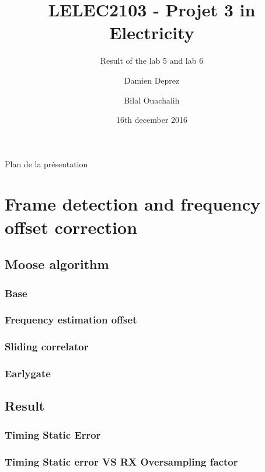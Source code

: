 \documentclass[11pt]{beamer}
\title{LELEC2103 - Projet 3 in Electricity}
\subtitle[\ldots]{Result of the lab 5 and lab 6}
\author[D. Deprez\and B. Ouachalih]{Damien Deprez\and Bilal Ouachalih}
\institute{EPL}
\date{16th december 2016}
\begin{document}
{
	\begin{frame}[noframenumbering]
		\titlepage
	\end{frame}
} 

{
	\begin{frame}[noframenumbering]{Plan de la présentation}
		\tableofcontents
	\end{frame}
}

\section{Frame detection and frequency offset correction}

\subsection{Moose algorithm}

\begin{frame}
\frametitle{Base}


\end{frame}


\subsubsection{Frequency estimation offset}
\begin{frame}
\frametitle{Sliding correlator}


\end{frame}

\subsubsection{}

\begin{frame}
\frametitle{Earlygate}


\end{frame}

\subsection{Result}
\subsubsection{Timing Static Error}
\begin{frame}
\frametitle{Timing Static error VS RX Oversampling factor}

\end{frame}
\end{document}

